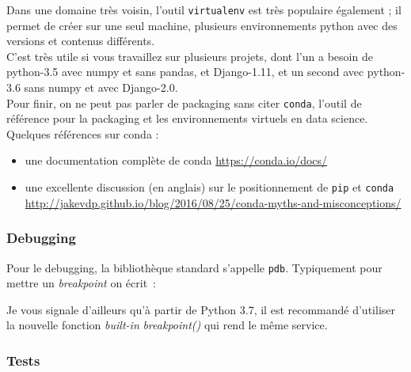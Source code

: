     Dans une domaine très voisin, l'outil \texttt{virtualenv} est très
populaire également ; il permet de créer sur une seul machine, plusieurs
environnements python avec des versions et contenus différents.\\

C'est très utile si vous travaillez sur plusieurs projets, dont l'un a
besoin de python-3.5 avec numpy et sans pandas, et Django-1.11, et un
second avec python-3.6 sans numpy et avec Django-2.0.\\

    Pour finir, on ne peut pas parler de packaging sans citer
\texttt{conda}, l'outil de référence pour la packaging et les
environnements virtuels en data science. Quelques références sur conda :

\begin{itemize}
\tightlist
\item
  une documentation complète de conda \url{https://conda.io/docs/}
\item
  une excellente discussion (en anglais) sur le positionnement de
  \texttt{pip} et \texttt{conda}
  \url{http://jakevdp.github.io/blog/2016/08/25/conda-myths-and-misconceptions/}
\end{itemize}

    \hypertarget{debugging}{%
\subsubsection{Debugging}\label{debugging}}

    Pour le debugging, la bibliothèque standard s'appelle \texttt{pdb}.
Typiquement pour mettre un \emph{breakpoint} on écrit~:

\begin{Shaded}
\begin{Highlighting}[]
\OperatorTok{=}\OperatorTok{**} 
    \OperatorTok{/} 
\end{Highlighting}
\end{Shaded}

    Je vous signale d'ailleurs qu'à partir de Python 3.7, il est recommandé
d'utiliser la nouvelle fonction \emph{built-in} \emph{breakpoint()} qui
rend le même service.

    \hypertarget{tests}{%
\subsubsection{Tests}\label{tests}}

